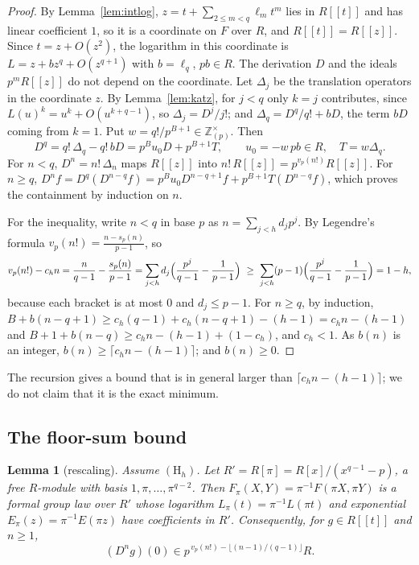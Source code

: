 \documentclass[11pt]{amsart}
\newtheorem{lemma}[thm]{Lemma}
\theoremstyle{definition}
\theoremstyle{remark}
\newcommand{\Z}{\mathbb Z}
\newcommand{\vp}{v_p}
\begin{document}
\begin{proof}
By Lemma~\ref{lem:intlog}, $z=t+\sum_{2\le m<q}\ell_mt^m$ lies in $R[[t]]$ and has linear coefficient $1$, so it is a coordinate on $F$ over $R$, and $R[[t]]=R[[z]]$. Since $t=z+O(z^2)$, the logarithm in this coordinate is $L=z+bz^q+O(z^{q+1})$ with $b=\ell_q$, $pb\in R$. The derivation $D$ and the ideals $p^mR[[z]]$ do not depend on the coordinate. Let $\Delta_j$ be the translation operators in the coordinate $z$. By Lemma~\ref{lem:katz}, for $j<q$ only $k=j$ contributes, since $L(u)^k=u^k+O(u^{k+q-1})$, so $\Delta_j=D^j/j!$; and $\Delta_q=D^q/q!+bD$, the term $bD$ coming from $k=1$. Put $w=q!/p^{B+1}\in\Z_{(p)}^\times$. Then
\begin{equation}\label{eq:keyop}
 D^q=q!\,\Delta_q-q!\,bD=p^Bu_0D+p^{B+1}T,\qquad u_0=-w\,pb\in R,\quad T=w\Delta_q .
\end{equation}
For $n<q$, $D^n=n!\,\Delta_n$ maps $R[[z]]$ into $n!\,R[[z]]=p^{\vp(n!)}R[[z]]$. For $n\ge q$, $D^nf=D^q(D^{n-q}f)=p^Bu_0D^{n-q+1}f+p^{B+1}T(D^{n-q}f)$, which proves the containment by induction on $n$.

For the inequality, write $n<q$ in base $p$ as $n=\sum_{j<h}d_jp^j$. By Legendre's formula $\vp(n!)=\frac{n-s_p(n)}{p-1}$, so
\[
 \vp(n!)-c_hn=\frac{n}{q-1}-\frac{s_p(n)}{p-1}=\sum_{j<h}d_j\Bigl(\frac{p^j}{q-1}-\frac1{p-1}\Bigr)\ \ge\ \sum_{j<h}(p-1)\Bigl(\frac{p^j}{q-1}-\frac1{p-1}\Bigr)=1-h,
\]
because each bracket is at most $0$ and $d_j\le p-1$. For $n\ge q$, by induction, $B+b(n-q+1)\ge c_h(q-1)+c_h(n-q+1)-(h-1)=c_hn-(h-1)$ and $B+1+b(n-q)\ge c_hn-(h-1)+(1-c_h)$, and $c_h<1$. As $b(n)$ is an integer, $b(n)\ge\lceil c_hn-(h-1)\rceil$; and $b(n)\ge0$.
\end{proof}

The recursion gives a bound that is in general larger than $\lceil c_hn-(h-1)\rceil$; we do not claim that it is the exact minimum.

\subsection{The floor-sum bound}

\begin{lemma}[rescaling]\label{lem:rescale}
Assume $(\mathrm H_h)$. Let $R'=R[\pi]=R[x]/(x^{q-1}-p)$, a free $R$-module with basis $1,\pi,\dots,\pi^{q-2}$. Then $F_\pi(X,Y)=\pi^{-1}F(\pi X,\pi Y)$ is a formal group law over $R'$ whose logarithm $L_\pi(t)=\pi^{-1}L(\pi t)$ and exponential $E_\pi(z)=\pi^{-1}E(\pi z)$ have coefficients in $R'$. Consequently, for $g\in R[[t]]$ and $n\ge1$,
\[
 (D^ng)(0)\in p^{\,\vp(n!)-\lfloor (n-1)/(q-1)\rfloor}R .
\]
\end{lemma}
\end{document}
